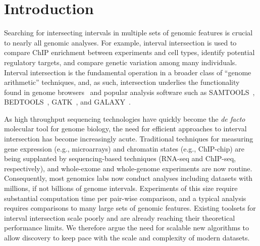 \documentclass{bioinfo}
\begin{document}
        \section{Introduction}

        Searching for intersecting intervals in multiple sets of genomic features is
        crucial to nearly all genomic analyses. For example, interval intersection is used
        to compare ChIP enrichment between experiments and cell types, identify potential
        regulatory targets, and compare genetic variation among many individuals.
        Interval intersection is the fundamental operation in a broader class of
        ``genome arithmetic'' techniques, and, as such, intersection underlies the
        functionality found in genome browsers~\citep{kent2002,robinson2011} and popular
        analysis software such as SAMTOOLS~\citep{li2009}, BEDTOOLS~\citep{quinlan2010}, 
        GATK~\citep{mckenna2010}, and GALAXY~\citep{giardine2005}.

        As high throughput sequencing technologies have quickly become the \emph{de facto}
        molecular tool for genome biology, the need for efficient approaches 
        to interval intersection has become increasingly acute. Traditional techniques 
        for measuring gene expression (e.g., microarrays) and chromatin states (e.g., ChIP-chip) 
        are being supplanted by sequencing-based techniques (RNA-seq and ChIP-seq, respectively), and
        whole-exome and whole-genome experiments are now routine. Consequently, most
        genomics labs now conduct analyses including datasets with millions, if not billions 
        of genome intervals. Experiments of this size require substantial computation time per 
        pair-wise comparison, and a typical analysis requires comparisons to many large
        sets of genomic features. Existing toolsets for interval intersection scale poorly 
        and are already reaching their theoretical performance limits. We therefore argue the
        need for scalable new algorithms to allow discovery to keep pace with
        the scale and complexity of modern datasets.
\end{document}

